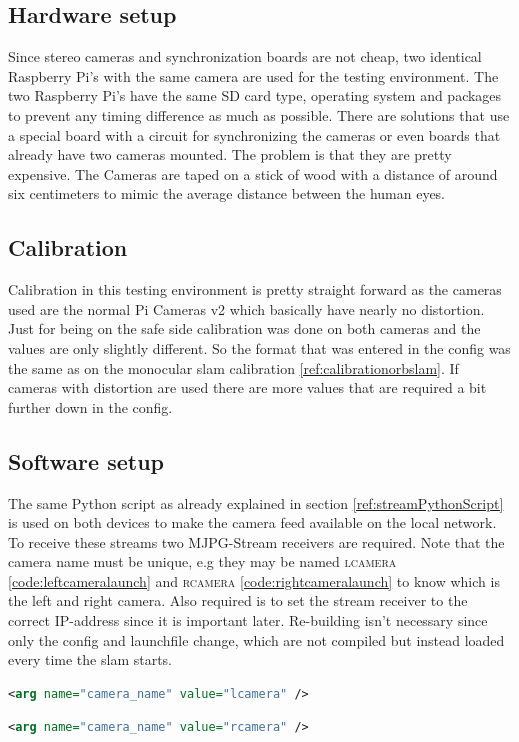 \subsection{Hardware setup}
Since stereo cameras and synchronization boards are not cheap, two identical Raspberry Pi's with the same camera are used for the testing environment. The two Raspberry Pi's have the same SD card type, operating system and packages to prevent any timing difference as much as possible. There are solutions that use a special board with a circuit for synchronizing the cameras or even boards that already have two cameras mounted. The problem is that they are pretty expensive. The Cameras are taped on a stick of wood with a distance of around six centimeters to mimic the average distance between the human eyes.

\subsection{Calibration}
Calibration in this testing environment is pretty straight forward as the cameras used are the normal Pi Cameras v2 which basically have nearly no distortion. Just for being on the safe side calibration was done on both cameras and the values are only slightly different. So the format that was entered in the config was the same as on the monocular \gls{slam} calibration \ref{ref:calibrationorbslam}. If cameras with distortion are used there are more values that are required a bit further down in the config.

\subsection{Software setup}
The same Python script as already explained in section \ref{ref:streamPythonScript} is used on both devices to make the camera feed available on the local network. To receive these streams two MJPG-Stream receivers are required. Note that the camera name must be unique, e.g they may be named \textsc{lcamera} \ref{code:leftcameralaunch} and \textsc{rcamera} \ref{code:rightcameralaunch} to know which is the left and right camera. Also required is to set the stream receiver to the correct IP-address since it is important later. Re-building isn't necessary since only the config and launchfile change, which are not compiled but instead loaded every time the \gls{slam} starts.\newline
\begin{lstlisting}[language=XML,caption={Left camera stream launch file},label={code:leftcameralaunch}]
	  	<arg name="camera_name" value="lcamera" />
\end{lstlisting}
\begin{lstlisting}[language=XML,caption={Right camera stream launch file},label={code:rightcameralaunch}]
	  	<arg name="camera_name" value="rcamera" />
\end{lstlisting}

